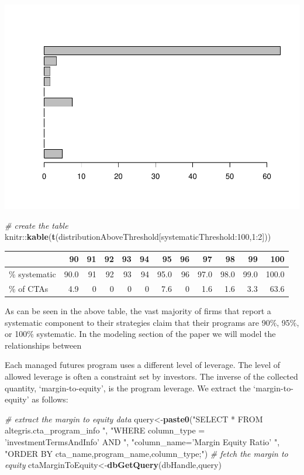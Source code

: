 \documentclass[]{article}
\newenvironment{Shaded}{\begin{snugshade}}{\end{snugshade}}
\newcommand{\KeywordTok}[1]{\textcolor[rgb]{0.13,0.29,0.53}{\textbf{{#1}}}}
\newcommand{\DecValTok}[1]{\textcolor[rgb]{0.00,0.00,0.81}{{#1}}}
\newcommand{\StringTok}[1]{\textcolor[rgb]{0.31,0.60,0.02}{{#1}}}
\newcommand{\CommentTok}[1]{\textcolor[rgb]{0.56,0.35,0.01}{\textit{{#1}}}}
\newcommand{\NormalTok}[1]{{#1}}
\begin{document}
\includegraphics{diversificationInTheManagedFuturesUniverse_files/figure-latex/unnamed-chunk-30-1.pdf}

\begin{Shaded}
\begin{Highlighting}[]
\CommentTok{# create the table}
\NormalTok{knitr::}\KeywordTok{kable}\NormalTok{(}\KeywordTok{t}\NormalTok{(distributionAboveThreshold[systematicThreshold:}\DecValTok{100}\NormalTok{,}\DecValTok{1}\NormalTok{:}\DecValTok{2}\NormalTok{]))}
\end{Highlighting}
\end{Shaded}

\begin{longtable}[c]{@{}lrrrrrrrrrrr@{}}
\toprule
& 90 & 91 & 92 & 93 & 94 & 95 & 96 & 97 & 98 & 99 & 100\tabularnewline
\midrule
\endhead
\% systematic & 90.0 & 91 & 92 & 93 & 94 & 95.0 & 96 & 97.0 & 98.0 &
99.0 & 100.0\tabularnewline
\% of CTAs & 4.9 & 0 & 0 & 0 & 0 & 7.6 & 0 & 1.6 & 1.6 & 3.3 &
63.6\tabularnewline
\bottomrule
\end{longtable}

As can be seen in the above table, the vast majority of firms that
report a systematic component to their strategies claim that their
programs are 90\%, 95\%, or 100\% systematic. In the modeling section of
the paper we will model the relationships between

Each managed futures program uses a different level of leverage. The
level of allowed leverage is often a constraint set by investors. The
inverse of the collected quantity, `margin-to-equity', is the program
leverage. We extract the `margin-to-equity' as follows:

\begin{Shaded}
\begin{Highlighting}[]
\CommentTok{# extract the margin to equity data}
\NormalTok{query<-}\KeywordTok{paste0}\NormalTok{(}\StringTok{"SELECT * FROM altegris.cta_program_info "}\NormalTok{,}
  \StringTok{"WHERE column_type = 'investmentTermsAndInfo' AND "}\NormalTok{,}
  \StringTok{"column_name='Margin  Equity Ratio' "}\NormalTok{,}
  \StringTok{"ORDER BY cta_name,program_name,column_type;"}\NormalTok{)}
\CommentTok{# fetch the margin to equity}
\NormalTok{ctaMarginToEquity<-}\KeywordTok{dbGetQuery}\NormalTok{(dbHandle,query)}
\end{Highlighting}
\end{Shaded}
\end{document}
